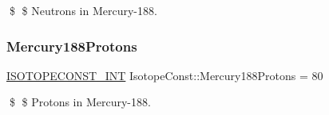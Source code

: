 \$ \$ Neutrons in Mercury-\/188. \mbox{\label{group___isotope_const-_mercury-_hg188_ga3919584d9043fd33c107ad7e8d116d84}} 
\subsubsection{\texorpdfstring{Mercury188\+Protons}{Mercury188Protons}}
{\footnotesize\ttfamily \mbox{\hyperlink{group___isotope_const-_macros_ga5f18360b3e99483a35c32d789e62621c}{I\+S\+O\+T\+O\+P\+E\+C\+O\+N\+S\+T\+\_\+\+I\+NT}} Isotope\+Const\+::\+Mercury188\+Protons = 80}

\$ \$ Protons in Mercury-\/188. 